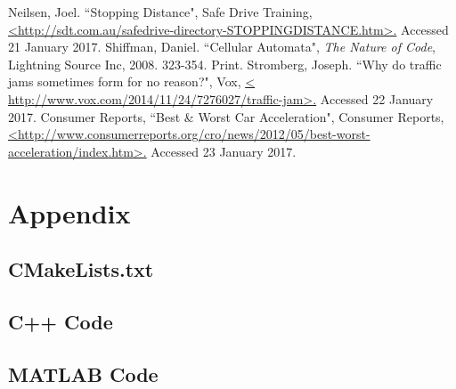\documentclass[a4paper]{article}
\begin{document}
	\newpage

	\begin{thebibliography}{0}
		 Neilsen, Joel. ``Stopping Distance", Safe Drive Training,  \url{<http://sdt.com.au/safedrive-directory-STOPPINGDISTANCE.htm>.} Accessed 21 January 2017.
		\bibitem{} Shiffman, Daniel. ``Cellular Automata", \textit{The Nature of Code}, Lightning Source Inc, 2008. 323-354. Print.
		 Stromberg, Joseph. ``Why do traffic jams sometimes form for no reason?", Vox, \url{< http://www.vox.com/2014/11/24/7276027/traffic-jam>.} Accessed 22 January 2017.
		 Consumer Reports, ``Best \& Worst Car Acceleration", Consumer Reports, \url{<http://www.consumerreports.org/cro/news/2012/05/best-worst-acceleration/index.htm>.} Accessed 23 January 2017.
	\end{thebibliography}








	\newpage

\section*{Appendix}
\subsection*{CMakeLists.txt}
\lstset{language=CMake}



\subsection*{C++ Code}
\lstset{language=C++}












\subsection*{MATLAB Code}
\lstset{language=Matlab}





\end{document}
